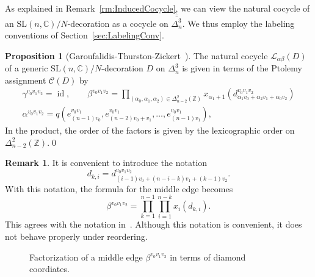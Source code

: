 \documentclass[12pt]{amsart}
\theoremstyle{definition}
\newtheorem{proposition}[theorem]{Proposition}
\newtheorem{remark}[theorem]{Remark}
\numberwithin{equation}{section}
\def\SL{\mathrm{SL}}
\DeclareMathOperator{\id}{id}
\def\Z{\mathbb{Z}}
\def\C{\mathbb{C}}
\begin{document}
As explained in Remark~\ref{rm:InducedCocycle}, we can view the natural cocycle of an $\SL(n,\C)/N$-decoration as a cocycle on $\overline{\overline{\Delta^3_n}}$. We thus employ the labeling conventions of Section~\ref{sec:LabelingConv}.
\begin{proposition}[Garoufalidis-Thurston-Zickert~\cite{GaroufalidisThurstonZickert}]\label{prop:NaturalCocycleLongShort}
The natural cocycle $\mathcal L_{\alpha\beta}(D)$ of a generic $\SL(n,\C)/N$-decoration $D$ on $\Delta^3_n$ is given in terms of the Ptolemy assignment $\mathcal C(D)$ by
\begin{equation}\label{eq:betaTrunc}
\begin{gathered}
\gamma^{v_0v_1v_2}=\id,\qquad \beta^{v_0v_1v_2}=\prod_{(\alpha_0,\alpha_1,\alpha_2)\in\Delta^2_{n-2}(\Z)} x_{\alpha_1+1}\left(d^{v_0v_1v_2}_{\alpha_1v_0+\alpha_2v_1+\alpha_0v_2}\right)\\\alpha^{v_0v_1v_2}=q(e^{v_0v_1}_{(n-1)v_0},e^{v_0v_1}_{(n-2)v_0+v_1},\dots,e^{v_0v_1}_{(n-1)v_1}),\qquad
\end{gathered}
\end{equation}
In the product, the order of the factors is given by the lexicographic order on $\Delta^2_{n-2}(\Z)$.\qed
\end{proposition}

\begin{remark} It is convenient to introduce the notation
\begin{equation}
d_{k,i}=d^{v_0v_1v_2}_{(i-1)v_0+(n-i-k)v_1+(k-1)v_2}.
\end{equation} 
With this notation, the formula for the middle edge becomes
\begin{equation}
\beta^{v_0v_1v_2}=\prod_{k=1}^{n-1}\prod_{i=1}^{n-k}x_i(d_{k,i}).
\end{equation}
This agrees with the notation in~\cite{GaroufalidisThurstonZickert}. Although this notation is convenient, it does not behave properly under reordering.
\end{remark}

\begin{figure}[htb]
\begin{center}
%

\caption{Factorization of a middle edge $\beta^{v_0v_1v_2}$ in terms of diamond coordiates.}\label{fig:DiamondFactorization}
\end{center}
\end{figure}
\end{document}
